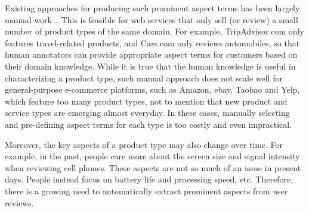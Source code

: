 
Existing approaches for producing such prominent aspect terms has been
largely manual work~\cite{poria2014rule,qiu2011opinion}. This is feasible for web services that only 
sell (or review) a small number of  product types of the same domain. 
For example, TripAdvisor.com only features travel-related products, 
and Cars.com only reviews automobiles, so that human annotators can provide 
appropriate aspect terms for customers based on their domain knowledge.  
While it is true that the human knowledge is useful
in characterizing a product type,
such manual approach does not scale well for 
general-purpose e-commerce platforms, such as Amazon, ebay,  
Taobao and Yelp, which feature too many product types, 
not to mention that new product and service types are emerging almost 
everyday.  
In these cases, manually selecting and pre-defining 
aspect terms for each type is too costly and even impractical.

Moreover, the key aspects of a product type may also change over time. 
For example, in the past, people care more about the screen 
size and signal intensity when reviewing cell phones. 
These aspects are not so much of an issue in present days. 
People instead focus on battery life and processing speed, etc.
Therefore, there is a growing need to automatically extract prominent 
aspects from user reviews.


%

